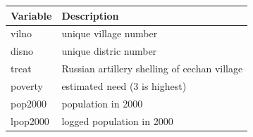 \documentclass[]{article}
\theoremstyle{definition}
\theoremstyle{definition}
\theoremstyle{definition}
\theoremstyle{remark}
\begin{document}
\begin{longtable}[]{@{}ll@{}}
\toprule
\begin{minipage}[b]{0.12\columnwidth}\raggedright\strut
Variable\strut
\end{minipage} & \begin{minipage}[b]{0.50\columnwidth}\raggedright\strut
Description\strut
\end{minipage}\tabularnewline
\midrule
\endhead
\begin{minipage}[t]{0.12\columnwidth}\raggedright\strut
vilno\strut
\end{minipage} & \begin{minipage}[t]{0.50\columnwidth}\raggedright\strut
unique village number\strut
\end{minipage}\tabularnewline
\begin{minipage}[t]{0.12\columnwidth}\raggedright\strut
disno\strut
\end{minipage} & \begin{minipage}[t]{0.50\columnwidth}\raggedright\strut
unique distric number\strut
\end{minipage}\tabularnewline
\begin{minipage}[t]{0.12\columnwidth}\raggedright\strut
treat\strut
\end{minipage} & \begin{minipage}[t]{0.50\columnwidth}\raggedright\strut
Russian artillery shelling of cechan village\strut
\end{minipage}\tabularnewline
\begin{minipage}[t]{0.12\columnwidth}\raggedright\strut
poverty\strut
\end{minipage} & \begin{minipage}[t]{0.50\columnwidth}\raggedright\strut
estimated need (3 is highest)\strut
\end{minipage}\tabularnewline
\begin{minipage}[t]{0.12\columnwidth}\raggedright\strut
pop2000\strut
\end{minipage} & \begin{minipage}[t]{0.50\columnwidth}\raggedright\strut
population in 2000\strut
\end{minipage}\tabularnewline
\begin{minipage}[t]{0.12\columnwidth}\raggedright\strut
lpop2000\strut
\end{minipage} & \begin{minipage}[t]{0.50\columnwidth}\raggedright\strut
logged population in 2000\strut
\end{minipage}\tabularnewline

\end{longtable}
\end{document}
